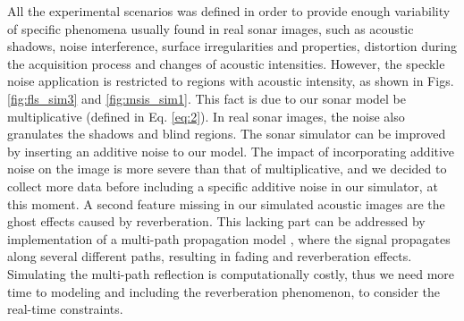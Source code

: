 \documentclass[final,5p,times]{elsarticle}
\begin{document}
All the experimental scenarios was defined in order to provide enough variability of specific phenomena usually found in real sonar images, such as acoustic shadows, noise interference, surface irregularities and properties, distortion during the acquisition process and changes of acoustic intensities. However, the speckle noise application is restricted to regions with acoustic intensity, as shown in Figs. \ref{fig:fls_sim3} and \ref{fig:msis_sim1}. This fact is due to our sonar model be multiplicative (defined in Eq. \ref{eq:2}). In real sonar images, the noise also granulates the shadows and blind regions. The sonar simulator can be improved by inserting an additive noise to our model.
The impact of incorporating additive noise on the image is more severe than that of multiplicative, and we decided to collect more data before including a specific additive noise in our simulator, at this moment. A second feature missing in our simulated acoustic images are the ghost effects caused by reverberation. This lacking part can be addressed by implementation of a multi-path propagation model \cite{huang2015b}, where the signal propagates along several different paths, resulting in fading and reverberation effects. Simulating the multi-path reflection is computationally costly, thus we need more time to modeling and including the reverberation phenomenon, to consider the real-time constraints.
\end{document}
